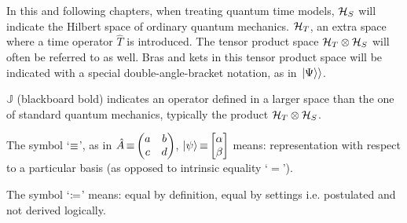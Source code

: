 In this and following chapters, when treating quantum time models,
$\mathcal{H}_S$ will indicate the Hilbert space of ordinary quantum mechanics.
$\mathcal{H}_T$, an extra space where a time operator $\hat{T}$ is introduced. The tensor
product space $\mathcal{H}_T \otimes \mathcal{H}_S$
will often be referred to as well.
Bras and kets in this tensor product space will be indicated with a special double-angle-bracket
notation, as in $\left.\left| \Psi \right\rangle\right\rangle$.

${\mathbb{J}}$ (blackboard bold) indicates an  operator defined in
a larger space than the one of standard quantum mechanics,
typically the product $\mathcal{H}_T \otimes \mathcal{H}_S$.

The symbol `$\operatorname*{\equiv}$', as in $\hat{A} \repr \mqty(a&b\\c&d)$, $\ket{\psi} \repr \mqty[\alpha \\ \beta]$
means: representation with respect to a particular basis (as opposed to intrinsic equality `$=$').

The symbol `$\coloneqq$'
means: equal by definition, equal by settings i.e. postulated and not derived logically.

